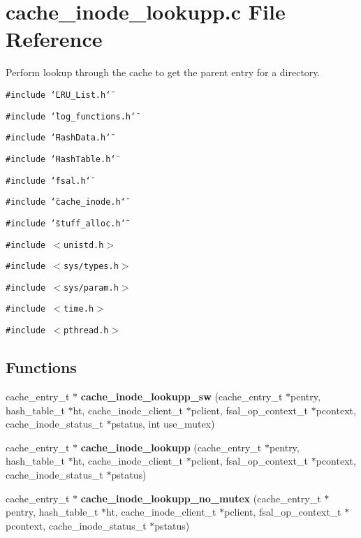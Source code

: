 \section{cache\_\-inode\_\-lookupp.c File Reference}
\label{cache__inode__lookupp_8c}
Perform lookup through the cache to get the parent entry for a directory. 

{\tt \#include \char`\"{}LRU\_\-List.h\char`\"{}}\par
{\tt \#include \char`\"{}log\_\-functions.h\char`\"{}}\par
{\tt \#include \char`\"{}Hash\-Data.h\char`\"{}}\par
{\tt \#include \char`\"{}Hash\-Table.h\char`\"{}}\par
{\tt \#include \char`\"{}fsal.h\char`\"{}}\par
{\tt \#include \char`\"{}cache\_\-inode.h\char`\"{}}\par
{\tt \#include \char`\"{}stuff\_\-alloc.h\char`\"{}}\par
{\tt \#include $<$unistd.h$>$}\par
{\tt \#include $<$sys/types.h$>$}\par
{\tt \#include $<$sys/param.h$>$}\par
{\tt \#include $<$time.h$>$}\par
{\tt \#include $<$pthread.h$>$}\par
\subsection*{Functions}
\begin{CompactItemize}
\item 
cache\_\-entry\_\-t $\ast$ {\bf cache\_\-inode\_\-lookupp\_\-sw} (cache\_\-entry\_\-t $\ast$pentry, hash\_\-table\_\-t $\ast$ht, cache\_\-inode\_\-client\_\-t $\ast$pclient, fsal\_\-op\_\-context\_\-t $\ast$pcontext, cache\_\-inode\_\-status\_\-t $\ast$pstatus, int use\_\-mutex)
\item 
cache\_\-entry\_\-t $\ast$ {\bf cache\_\-inode\_\-lookupp} (cache\_\-entry\_\-t $\ast$pentry, hash\_\-table\_\-t $\ast$ht, cache\_\-inode\_\-client\_\-t $\ast$pclient, fsal\_\-op\_\-context\_\-t $\ast$pcontext, cache\_\-inode\_\-status\_\-t $\ast$pstatus)
\item 
cache\_\-entry\_\-t $\ast$ {\bf cache\_\-inode\_\-lookupp\_\-no\_\-mutex} (cache\_\-entry\_\-t $\ast$pentry, hash\_\-table\_\-t $\ast$ht, cache\_\-inode\_\-client\_\-t $\ast$pclient, fsal\_\-op\_\-context\_\-t $\ast$pcontext, cache\_\-inode\_\-status\_\-t $\ast$pstatus)
\end{CompactItemize}


